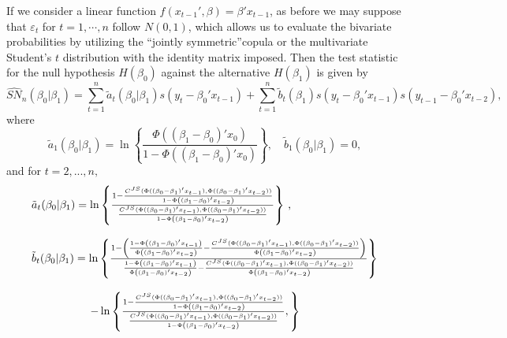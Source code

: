 \documentclass[harvard,11pt]{article}
\begin{document}
If we consider a linear function $f(x_{t-1}',\beta)=\beta'x_{t-1}$, as before we may suppose that $\varepsilon_{t}$ for $t=1,\cdots,n$ follow $N(0,1)$, which allows us to evaluate the bivariate probabilities by utilizing the \textquotedblleft jointly symmetric\textquotedblright copula or the multivariate Student's $t$ distribution with the identity matrix imposed. Then the test statistic for the null hypothesis $H(\beta_0)$ against the alternative $H(\beta_1)$ is given by
\begin{equation*}
\widehat{SN}_{n}(\beta _{0}|\beta _{1})=\sum\limits_{t=1}^{n}\tilde{a}%
_{t}(\beta _{0}|\beta _{1})s(y_{t}-\beta_0'x_{t-1})+\sum\limits_{t=1}^{n}\tilde{b}_{t}(\beta _{1})%
s(y_{t}-\beta_0'x_{t-1})s(y_{t-1}-\beta_0'x_{t-2}),
\end{equation*}%
where%
\begin{equation*}
\tilde{a}_{1}(\beta _{0}|\beta _{1})=\ln \left\{ \frac{\Phi\left(\left(\beta_1-\beta_0\right)'x_0\right) }{1-\Phi\left(\left(\beta_1-\beta_0\right)'x_0\right) }\right\} ,\quad%
\tilde{b}_{1}(\beta _{0}|\beta _{1})=0,
\end{equation*}%
and for $t=2,...,n,$%
\begin{equation*}
\begin{tabular}{l}
$\tilde{a}_{t}(\beta _{0}|\beta _{1})=\ln \left\{ \frac{1-\frac{C^{JS}(\Phi((\beta_0-\beta_1)'x_{t-1}),\Phi((\beta_0-\beta_1)'x_{t-2}) ) }{1-\Phi\left(\left(\beta_1-\beta_0\right)'x_{t-2}\right)}}{\frac{C^{JS}(\Phi((\beta_0-\beta_1)'x_{t-1}),\Phi((\beta_0-\beta_1)'x_{t-2}) )}{1-\Phi\left(\left(\beta_1-\beta_0\right)'x_{t-2}\right)}}\right\} 
$ ,\\ 
\\ 
$\tilde{b}_{t}(\beta _{0}|\beta _{1})=\ln \left\{ \frac{1-\left( \frac{1-\Phi\left(\left(\beta_1-\beta_0\right)'x_{t-1}\right) }{\Phi\left(\left(\beta_1-\beta_0\right)'x_{t-2}\right)}-\frac{C^{JS}(\Phi((\beta_0-\beta_1)'x_{t-1}),\Phi((\beta_0-\beta_1)'x_{t-2}) )}{\Phi\left(\left(\beta_1-\beta_0\right)'x_{t-2}\right) }\right) }{\frac{1-\Phi\left(\left(\beta_1-\beta_0\right)'x_{t-1}\right)}{\Phi\left(\left(\beta_1-\beta_0\right)'x_{t-2}\right)}-\frac{C^{JS}(\Phi((\beta_0-\beta_1)'x_{t-1}),\Phi((\beta_0-\beta_1)'x_{t-2}) ) }{\Phi\left(\left(\beta_1-\beta_0\right)'x_{t-2}\right)}}\right\} $ \\ 
\ \ \ \ \ \ \ \ \ \ \ \ \ \ \  \\ 
\ \ \ \ \ \ \ \ \ \ \ \ \ \ \ \ $-\ln \left\{ \frac{1-\frac{C^{JS}(\Phi((\beta_0-\beta_1)'x_{t-1}),\Phi((\beta_0-\beta_1)'x_{t-2}) ) }{1-\Phi\left(\left(\beta_1-\beta_0\right)'x_{t-2}\right) }}{\frac{C^{JS}(\Phi((\beta_0-\beta_1)'x_{t-1}),\Phi((\beta_0-\beta_1)'x_{t-2}) )}{1-\Phi\left(\left(\beta_1-\beta_0\right)'x_{t-2}\right)}},\right\} 
$%
\end{tabular}%
\end{equation*}%
\end{document}

